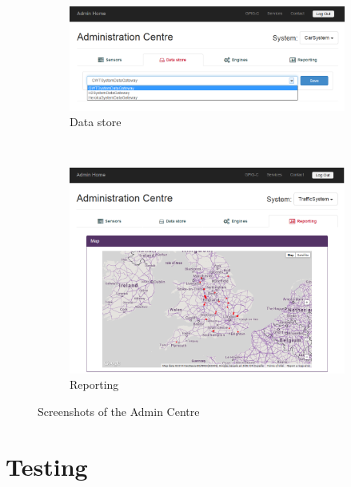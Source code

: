\documentclass[10pt,a4paper]{article}
\begin{document}
\begin{figure}[h!b]
    \begin{subfigure}{0.49\textwidth}
        \includegraphics[width=\textwidth]{images/admin-centre_data.png}
        \caption{Data store}
        \label{fig:admin-centre_data}
    \end{subfigure}
	~
	\begin{subfigure}{0.49\textwidth}
        \includegraphics[width=\textwidth]{images/admin-centre_report.png}
        \caption{Reporting}
        \label{fig:admin-centre_report}
    \end{subfigure}
    \caption{Screenshots of the Admin Centre}
	\label{fig:admin-centre}
\end{figure}

\section{Testing}
\label{sec:testing}
\end{document}
